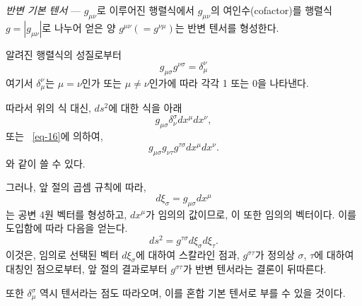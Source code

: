 \emph{반변 기본 텐서} --- 
$g_{\mu\nu}$로 이루어진 행렬식에서 $g_{\mu\nu}$의 여인수(cofactor)를 행렬식 $g=\left|g_{\mu\nu}\right|$로 나누어 얻은 양 $g^{\mu\nu}(=g^{\nu\mu})$는 반변 텐서를 형성한다.\par
알려진 행렬식의 성질로부터
\begin{equation} \label{eq-16}
	g_{\mu\sigma} g^{\nu\sigma} = \delta_\mu^\nu
\end{equation}
여기서 $\delta_\mu^\nu$는 $\mu=\nu$인가 또는 $\mu\ne\nu$인가에 따라 각각 1 또는 0을 나타낸다.

따라서 위의 식 대신, $ds^2$에 대한 식을 아래
\[g_{\mu\sigma}\delta_\nu^\sigma dx^\mu dx^\nu ,\]
또는 ~\eqref{eq-16}에 의하여,
\[g_{\mu\sigma} g_{\nu\tau} g^{\tau\sigma} dx^\mu dx^\nu .\]
와 같이 쓸 수 있다.

그러나, 앞 절의 곱셈 규칙에 따라,
\[d\xi_\sigma = g_{\mu\sigma}dx^\mu\]
는 공변 4원 벡터를 형성하고, $dx^\mu$가 임의의 값이므로, 이 또한 임의의 벡터이다. 이를 도입함에 따라 다음을 얻는다.
\[ds^2=g^{\tau\sigma} d\xi_\sigma d\xi_\tau .\]
이것은, 임의로 선택된 벡터 $d\xi_\sigma$에 대하여 스칼라인 점과,  $g^{\sigma\tau}$가 정의상 \Index{} $\sigma$, $\tau$에 대하여 대칭인 점으로부터, 앞 절의 결과로부터  $g^{\sigma\tau}$가 반변 텐서라는 결론이 뒤따른다.

또한 $\delta_\mu^\sigma$ 역시 텐서라는 점도 따라오며, 이를 혼합 기본 텐서로 부를 수 있을 것이다.

